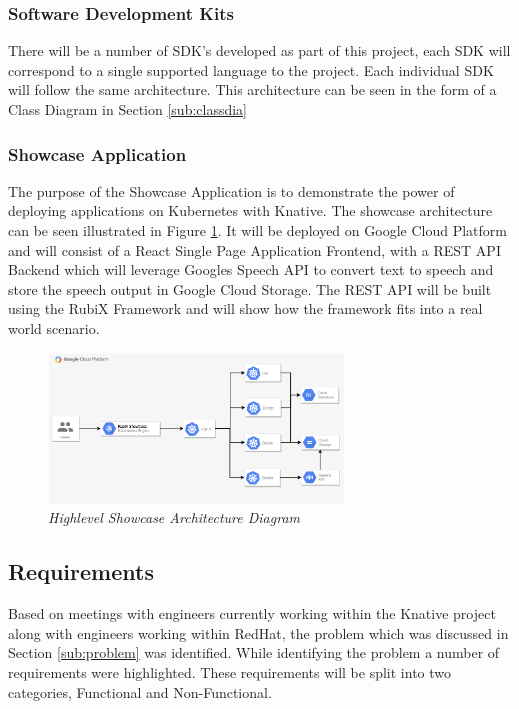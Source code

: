 \subsubsection{Software Development Kits}
\label{sub:sdks}
There will be a number of SDK's developed as part of this project, each SDK will correspond to a single supported language to the project. Each individual SDK will follow the same architecture. This architecture can be seen in the form of a Class Diagram in Section \ref{sub:classdia}

\subsubsection{Showcase Application}
\label{sub:showap}
The purpose of the Showcase Application is to demonstrate the power of deploying applications on Kubernetes with Knative. The showcase architecture can be seen illustrated in Figure \ref{img:showcase-arch}. It will be deployed on Google Cloud Platform and will consist of a React Single Page Application Frontend, with a REST API Backend which will leverage Googles Speech API to convert text to speech and store the speech output in Google Cloud Storage. The REST API will be built using the RubiX Framework and will show how the framework fits into a real world scenario.

\begin{figure}[!ht]
\centering
\includegraphics*[width=0.7\textwidth]{images/showcase-api-3.png}
\caption{\em Highlevel Showcase Architecture Diagram}
\label{img:showcase-arch}
\end{figure}


\subsection{Requirements}
Based on meetings with engineers currently working within the Knative project along with engineers working within RedHat, the problem which was discussed in Section \ref{sub:problem} was identified. While identifying the problem a number of requirements were highlighted. These requirements will be split into two categories, Functional and Non-Functional. 

